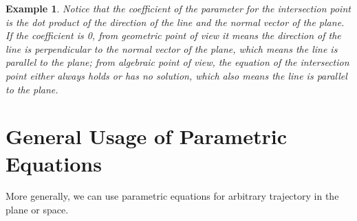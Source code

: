 \documentclass{article}
\newtheorem{example}{Example}
\begin{document}
\begin{example}
  Notice that the coefficient of the parameter for the intersection point is 
  the dot product of the direction of the line and the normal vector of the 
  plane. If the coefficient is 0, from geometric point of view it means the 
  direction of the line is perpendicular to the normal vector of the plane, 
  which means the line is parallel to the plane; from algebraic point of view, 
  the equation of the intersection point either always holds or has no 
  solution, which also means the line is parallel to the plane.

\end{example}

\section{General Usage of Parametric Equations}

More generally, we can use parametric equations for arbitrary trajectory in 
the plane or space.
\end{document}
